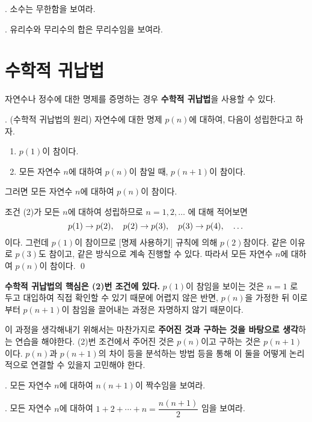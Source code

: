 \vspace*{80px}

\ex. 소수는 무한함을 보여라.

\vspace*{80px}

\ex. 유리수와 무리수의 합은 무리수임을 보여라.

\newpage

\section{수학적 귀납법}

자연수나 정수에 대한 명제를 증명하는 경우 \textbf{수학적 귀납법}을 사용할 수 있다.

\thm. (수학적 귀납법의 원리) 자연수에 대한 명제 \(p(n)\)에 대하여, 다음이 성립한다고 하자.
\begin{enumerate}
    \item \(p(1)\)이 참이다.
    \item 모든 자연수 \(n\)에 대하여 \(p(n)\)이 참일 때, \(p(n+1)\)이 참이다.
\end{enumerate}
그러면 모든 자연수 \(n\)에 대하여 \(p(n)\)이 참이다.

\pf 조건 (2)가 모든 \(n\)에 대하여 성립하므로 \(n = 1, 2, \dots\) 에 대해 적어보면
\[
    p(1) \rightarrow p(2), \quad p(2) \rightarrow p(3), \quad p(3) \rightarrow p(4), \quad \dots
\]
이다. 그런데 \(p(1)\)이 참이므로 [명제 사용하기] 규칙에 의해 \(p(2)\)참이다. 같은 이유로 \(p(3)\)도 참이고, 같은 방식으로 계속 진행할 수 있다. 따라서 모든 자연수 \(n\)에 대하여 \(p(n)\)이 참이다. \qed

\textbf{수학적 귀납법의 핵심은 (2)번 조건에 있다.} \(p(1)\)이 참임을 보이는 것은 \(n = 1\) 로 두고 대입하여 직접 확인할 수 있기 때문에 어렵지 않은 반면, \(p(n)\)을 가정한 뒤 이로부터 \(p(n+1)\)이 참임을 끌어내는 과정은 자명하지 않기 때문이다.

이 과정을 생각해내기 위해서는 마찬가지로 \textbf{주어진 것과 구하는 것을 바탕으로 생각}하는 연습을 해야한다. (2)번 조건에서 주어진 것은 \(p(n)\)이고 구하는 것은 \(p(n+1)\)이다. \(p(n)\)과 \(p(n+1)\)의 차이 등을 분석하는 방법 등을 통해 이 둘을 어떻게 논리적으로 연결할 수 있을지 고민해야 한다.

\ex. 모든 자연수 \(n\)에 대하여 \(n(n+1)\)이 짝수임을 보여라.

\vspace*{100px}

\ex. 모든 자연수 \(n\)에 대하여 \(1 + 2 + \cdots + n = \dfrac{n(n+1)}{2}\) 임을 보여라.

\pagebreak

